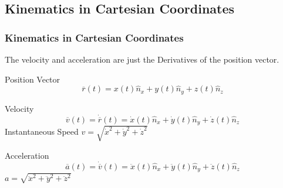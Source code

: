 \subsection{Kinematics in Cartesian Coordinates}
\begin{frame}
\frametitle{Kinematics in Cartesian Coordinates}
The velocity and acceleration are just the \alert{Derivatives} of the \alert{position vector}.
\begin{block}{Position Vector}
\[\overline{r}(t)=x(t)\hat{n}_x+y(t)\hat{n}_y+z(t)\hat{n}_z\]
\end{block}
\begin{block}{Velocity}
\[\overline{v}(t)=\dot{\overline{r}}(t)=\dot x(t)\hat{n}_x+\dot y(t)\hat{n}_y+\dot z(t)\hat{n}_z\]
Instantaneous \alert{Speed} $v=\sqrt{\dot{x}^2+\dot{y}^2+\dot{z}^2}$
\end{block}
\begin{block}{Acceleration}
\[\overline{a}(t)=\dot{\overline{v}}(t)=\ddot x(t) \hat n_x+\ddot y(t)\hat n_y+\ddot z(t)\hat n_z\]
$a=\sqrt{\ddot x^2+\ddot y^2+\ddot z^2}$
\end{block}
\end{frame}
